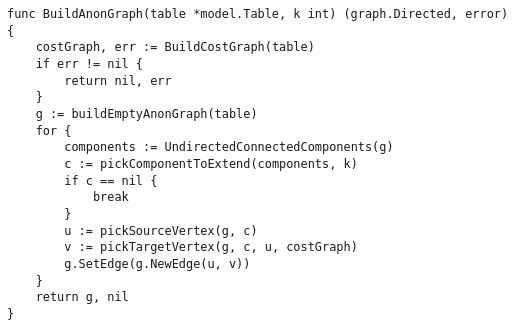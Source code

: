 \begin{lstlisting}[caption=Forest building algorithm,label=lst:forest_building,float,floatplacement=H]
func BuildAnonGraph(table *model.Table, k int) (graph.Directed, error) {
    costGraph, err := BuildCostGraph(table)
    if err != nil {
        return nil, err
    }
    g := buildEmptyAnonGraph(table)
    for {
        components := UndirectedConnectedComponents(g)
        c := pickComponentToExtend(components, k)
        if c == nil {
            break
        }
        u := pickSourceVertex(g, c)
        v := pickTargetVertex(g, c, u, costGraph)
        g.SetEdge(g.NewEdge(u, v))
    }
    return g, nil
}
\end{lstlisting}